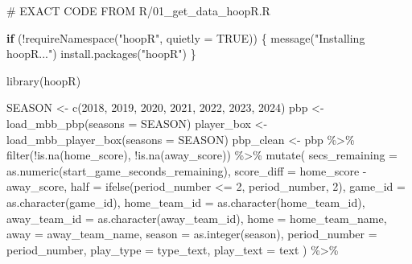 \documentclass[
  letterpaper,
  DIV=11,
  numbers=noendperiod]{scrartcl}
\newenvironment{Shaded}{\begin{snugshade}}{\end{snugshade}}
\newcommand{\AttributeTok}[1]{\textcolor[rgb]{0.40,0.45,0.13}{#1}}
\newcommand{\CommentTok}[1]{\textcolor[rgb]{0.37,0.37,0.37}{#1}}
\newcommand{\ConstantTok}[1]{\textcolor[rgb]{0.56,0.35,0.01}{#1}}
\newcommand{\ControlFlowTok}[1]{\textcolor[rgb]{0.00,0.23,0.31}{\textbf{#1}}}
\newcommand{\DecValTok}[1]{\textcolor[rgb]{0.68,0.00,0.00}{#1}}
\newcommand{\FunctionTok}[1]{\textcolor[rgb]{0.28,0.35,0.67}{#1}}
\newcommand{\NormalTok}[1]{\textcolor[rgb]{0.00,0.23,0.31}{#1}}
\newcommand{\OtherTok}[1]{\textcolor[rgb]{0.00,0.23,0.31}{#1}}
\newcommand{\SpecialCharTok}[1]{\textcolor[rgb]{0.37,0.37,0.37}{#1}}
\newcommand{\StringTok}[1]{\textcolor[rgb]{0.13,0.47,0.30}{#1}}
\begin{document}
\begin{Shaded}
\begin{Highlighting}[]
\CommentTok{\# EXACT CODE FROM R/01\_get\_data\_hoopR.R}

\ControlFlowTok{if}\NormalTok{ (}\SpecialCharTok{!}\FunctionTok{requireNamespace}\NormalTok{(}\StringTok{"hoopR"}\NormalTok{, }\AttributeTok{quietly =} \ConstantTok{TRUE}\NormalTok{)) \{}
  \FunctionTok{message}\NormalTok{(}\StringTok{"Installing hoopR..."}\NormalTok{)}
  \FunctionTok{install.packages}\NormalTok{(}\StringTok{"hoopR"}\NormalTok{)}
\NormalTok{\}}

\FunctionTok{library}\NormalTok{(hoopR)}

\NormalTok{SEASON }\OtherTok{\textless{}{-}} \FunctionTok{c}\NormalTok{(}\DecValTok{2018}\NormalTok{, }\DecValTok{2019}\NormalTok{, }\DecValTok{2020}\NormalTok{, }\DecValTok{2021}\NormalTok{, }\DecValTok{2022}\NormalTok{, }\DecValTok{2023}\NormalTok{, }\DecValTok{2024}\NormalTok{)}
\NormalTok{pbp }\OtherTok{\textless{}{-}} \FunctionTok{load\_mbb\_pbp}\NormalTok{(}\AttributeTok{seasons =}\NormalTok{ SEASON)}
\NormalTok{player\_box }\OtherTok{\textless{}{-}} \FunctionTok{load\_mbb\_player\_box}\NormalTok{(}\AttributeTok{seasons =}\NormalTok{ SEASON)}
\NormalTok{pbp\_clean }\OtherTok{\textless{}{-}}\NormalTok{ pbp }\SpecialCharTok{\%\textgreater{}\%}
  \FunctionTok{filter}\NormalTok{(}\SpecialCharTok{!}\FunctionTok{is.na}\NormalTok{(home\_score), }\SpecialCharTok{!}\FunctionTok{is.na}\NormalTok{(away\_score)) }\SpecialCharTok{\%\textgreater{}\%}
  \FunctionTok{mutate}\NormalTok{(}
    \AttributeTok{secs\_remaining =} \FunctionTok{as.numeric}\NormalTok{(start\_game\_seconds\_remaining),}
    \AttributeTok{score\_diff =}\NormalTok{ home\_score }\SpecialCharTok{{-}}\NormalTok{ away\_score,}
    \AttributeTok{half =} \FunctionTok{ifelse}\NormalTok{(period\_number }\SpecialCharTok{\textless{}=} \DecValTok{2}\NormalTok{, period\_number, }\DecValTok{2}\NormalTok{),}
    \AttributeTok{game\_id =} \FunctionTok{as.character}\NormalTok{(game\_id),}
    \AttributeTok{home\_team\_id =} \FunctionTok{as.character}\NormalTok{(home\_team\_id),}
    \AttributeTok{away\_team\_id =} \FunctionTok{as.character}\NormalTok{(away\_team\_id),}
    \AttributeTok{home =}\NormalTok{ home\_team\_name,}
    \AttributeTok{away =}\NormalTok{ away\_team\_name,}
    \AttributeTok{season =} \FunctionTok{as.integer}\NormalTok{(season),}
    \AttributeTok{period\_number =}\NormalTok{ period\_number,}
    \AttributeTok{play\_type =}\NormalTok{ type\_text,}
    \AttributeTok{play\_text =}\NormalTok{ text}
\NormalTok{  ) }\SpecialCharTok{\%\textgreater{}\%}

\end{Highlighting}
\end{Shaded}
\end{document}
